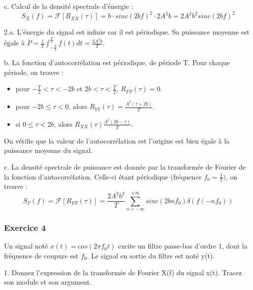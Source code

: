 \documentclass[11pt]{report}
\begin{document}
	c. Calcul de la densité spectrale d'énergie :
	\begin{equation*}
	S_{X}(f)=\mathcal{F}[R_{XX}(\tau)]=b\cdot sinc(2bf)^{2}\cdot 2A^{2}b=2A^{2}b^{2}sinc(2bf)^{2}	
	\end{equation*}

	\vspace{0.5\baselineskip}
	
	2.a. L'énergie du signal est infinie car il est périodique. Sa puissance moyenne est égale à $\overline{P}=\frac{1}{T}\int_{-\frac{T}{2}}^{\frac{T}{2}}f(t)dt=\frac{2A^{2}b}{T}$. 

	b. La fonction d'autocorrélation est périodique, de période T. Pour chaque période, on trouve :
	\begin{itemize}
		\item pour $-\frac{T}{2}<\tau<-2b$ et $2b<\tau<\frac{T}{2}$,  $R_{FF}(\tau)=0$.
		\item pour $-2b \leq \tau < 0$, alors $R_{YY}(\tau)=\frac{A^{2}(\tau+2b)}{T}$.
		\item si $0 \leq \tau < 2b$, alors $R_{XX}(\tau)\frac{A^{2}(2b-\tau)}{T}$. 
	\end{itemize}
	On vérifie que la valeur de l'autocorrélation est l'origine est bien égale à la puissance moyenne du signal.
	
	\vspace{0.5\baselineskip}
	
	c. La densité spectrale de puissance est donnée par la transformée de Fourier de la fonction d'autocorrélation. Celle-ci étant périodique (fréquence $f_{0}=\frac{1}{T})$, on trouve :
	\begin{equation*}
	S_{F}(f)=\mathcal{F}[R_{FF}(\tau)]=\frac{2A^{2}b^{2}}{T}\sum_{n=-\infty}^{+\infty}sinc(2bnf_{0})\delta(f(-nf_{0}))
	\end{equation*}
	
	
	\vspace{1\baselineskip}	
	
	\subsubsection{Exercice 4}
	
	Un signal noté $x(t)=cos(2\pi f_{0}t)$ excite un filtre passe-bas d'ordre 1, dont la fréquence de coupure est $f_{0}$. Le signal en sortie du filtre est noté y(t).
	
	\vspace{0.5\baselineskip}	
	
	1. Donnez l'expression de la transformée de Fourier X(f) du signal x(t). Tracez son module et son argument.
	
\end{document}
